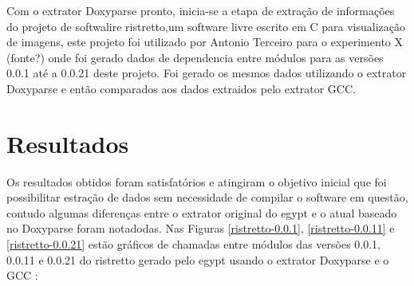 Com o extrator Doxyparse pronto, inicia-se a etapa de extração de informações do projeto de softwalire ristretto,um software livre escrito em C para visualização de imagens, este projeto foi utilizado por Antonio Terceiro para o experimento X (fonte?) onde foi gerado dados de dependencia entre módulos para as versões 0.0.1 até a 0.0.21 deste projeto. Foi gerado os mesmos dados utilizando o extrator Doxyparse e então comparados aos dados extraidos pelo extrator GCC.

\section{Resultados}

Os resultados obtidos foram satisfatórios e atingiram o objetivo inicial que foi possibilitar estração de dados sem necessidade de compilar o software em questão, contudo algumas diferenças entre o extrator original do egypt e o atual baseado no Doxyparse foram notadodas. Nas Figuras \ref{ristretto-0.0.1}, \ref{ristretto-0.0.11} e \ref{ristretto-0.0.21} estão gráficos de chamadas entre módulos das versões 0.0.1, 0.0.11 e 0.0.21 do ristretto gerado pelo egypt usando o extrator Doxyparse e o GCC :

